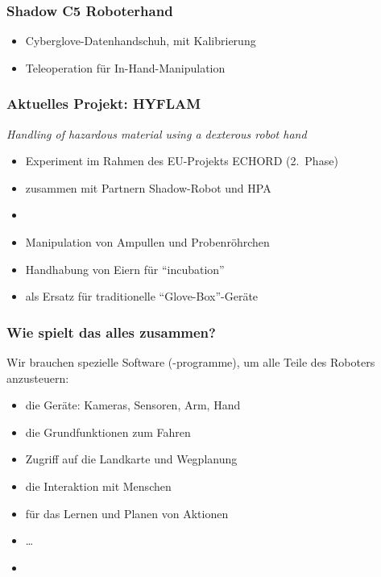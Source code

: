 \documentclass[t]{beamer}
\def\ii{\item[]}
\begin{document}
\begin{frame}
\frametitle{Shadow C5 Roboterhand}
\begin{itemize}
\item Cyberglove-Datenhandschuh, mit Kalibrierung
\item Teleoperation für In-Hand-Manipulation
\end{itemize}
\end{frame}


\begin{frame}
\frametitle{Aktuelles Projekt: HYFLAM}
{\em Handling of hazardous material using a dexterous robot hand}
\begin{itemize}
\item Experiment im Rahmen des EU-Projekts ECHORD (2.~Phase)
\item zusammen mit Partnern Shadow-Robot und HPA
\item[]
\item Manipulation von Ampullen und Probenröhrchen
\item Handhabung von Eiern für "`incubation"'
\item als Ersatz für traditionelle "`Glove-Box"'-Geräte
\end{itemize}
\end{frame}


\begin{frame}
\frametitle{Wie spielt das alles zusammen?}
Wir brauchen spezielle Software (-programme), um alle Teile
des Roboters anzusteuern:
\begin{itemize}
\item die Geräte: Kameras, Sensoren, Arm, Hand
\item die Grundfunktionen zum Fahren
\item Zugriff auf die Landkarte und Wegplanung
\item die Interaktion mit Menschen
\item für das Lernen und Planen von Aktionen
\item \dots
\ii
\end{itemize}
\end{frame}
\end{document}

